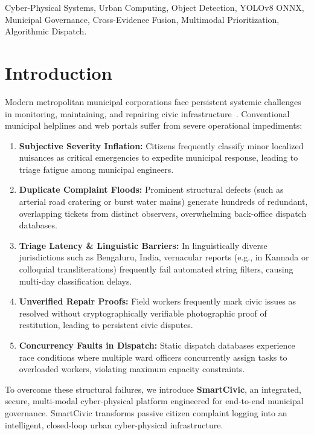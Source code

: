 \documentclass[conference]{IEEEtran}
\begin{document}
\begin{IEEEkeywords}
Cyber-Physical Systems, Urban Computing, Object Detection, YOLOv8 ONNX, Municipal Governance, Cross-Evidence Fusion, Multimodal Prioritization, Algorithmic Dispatch.
\end{IEEEkeywords}

\section{Introduction}
Modern metropolitan municipal corporations face persistent systemic challenges in monitoring, maintaining, and repairing civic infrastructure~\cite{zheng2014urban}. Conventional municipal helplines and web portals suffer from severe operational impediments:
\begin{enumerate}
    \item \textbf{Subjective Severity Inflation:} Citizens frequently classify minor localized nuisances as critical emergencies to expedite municipal response, leading to triage fatigue among municipal engineers.
    \item \textbf{Duplicate Complaint Floods:} Prominent structural defects (such as arterial road cratering or burst water mains) generate hundreds of redundant, overlapping tickets from distinct observers, overwhelming back-office dispatch databases.
    \item \textbf{Triage Latency \& Linguistic Barriers:} In linguistically diverse jurisdictions such as Bengaluru, India, vernacular reports (e.g., in Kannada or colloquial transliterations) frequently fail automated string filters, causing multi-day classification delays.
    \item \textbf{Unverified Repair Proofs:} Field workers frequently mark civic issues as resolved without cryptographically verifiable photographic proof of restitution, leading to persistent civic disputes.
    \item \textbf{Concurrency Faults in Dispatch:} Static dispatch databases experience race conditions where multiple ward officers concurrently assign tasks to overloaded workers, violating maximum capacity constraints.
\end{enumerate}

To overcome these structural failures, we introduce \textbf{SmartCivic}, an integrated, secure, multi-modal cyber-physical platform engineered for end-to-end municipal governance. SmartCivic transforms passive citizen complaint logging into an intelligent, closed-loop urban cyber-physical infrastructure.
\end{document}
